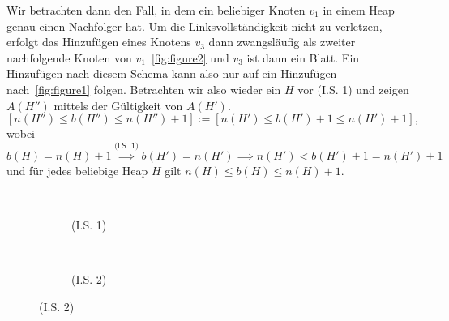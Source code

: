 \documentclass[10pt]{article}
\begin{document}
\begin{loesung}
\begin{enumerate}
\begin{beweis}
                \IS[2] Wir betrachten dann den Fall, in dem ein beliebiger Knoten $v_1$ in einem Heap genau einen Nachfolger hat.
                Um die Linksvollständigkeit nicht zu verletzen, erfolgt das Hinzufügen eines Knotens $v_3$ dann zwangsläufig als zweiter nachfolgende Knoten von $v_1$~\autoref{fig:figure2} und $v_3$ ist dann ein Blatt.
                Ein Hinzufügen nach diesem Schema kann also nur auf ein Hinzufügen nach~\autoref{fig:figure1} folgen.
                Betrachten wir also wieder ein $H$ vor \textsf{(I.S. 1)} und zeigen $A(H'')$ mittels der Gültigkeit von $A(H')$.
                \[
                    [n(H'') \leq b(H'') \leq n(H'') + 1] := [n(H') \leq b(H') + 1 \leq n(H') + 1],
                \]
                wobei $b(H) = n(H) + 1 \stackrel{\textsf{(I.S. 1)}}{\implies} b(H') = n(H') \implies n(H') < b(H') + 1 = n(H') + 1$ und für jedes beliebige Heap $H$ gilt $n(H) \leq b(H) \leq n(H) + 1$.
            \end{beweis}
            \begin{figure}[h]
                \caption{Induktionsschritte}
                \centering
                \begin{subfigure}{.3\textwidth}
                    \caption{{\sf(I.S. 1)}}
                    \\[1pt]
                    \centering
                     \Rightarrow
                    \label{fig:figure1}
                \end{subfigure}
                \begin{subfigure}{.3\textwidth}
                    \caption{{\sf(I.S. 2)}}
                    \\[1pt]

\end{subfigure}
\end{figure}
\end{enumerate}
\end{loesung}
\end{document}
